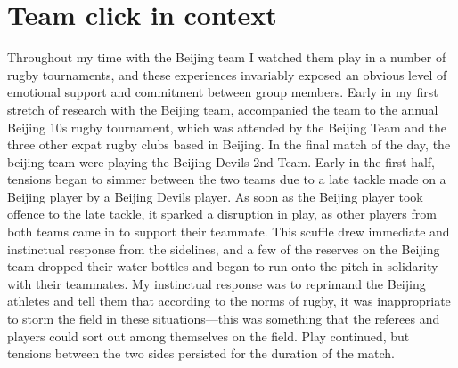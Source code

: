 
\begin{savequote}[8cm]

  \qauthor{}
\end{savequote}



\chapter{Team click in context \label{chap:ethnoResults}}

\minitoc






                                      \begin{CJK}{UTF8}{gbsn}



Throughout my time with the Beijing team I watched them play in a number of rugby tournaments, and these experiences invariably exposed an obvious level of emotional support and commitment between group members.  Early in my first stretch of research with the Beijing team, accompanied the team to the annual Beijing 10s rugby tournament, which was attended by the Beijing Team and the three other expat rugby clubs based in Beijing.  In the final match of the day, the beijing team were playing the Beijing Devils 2nd Team.  Early in the first half, tensions began to simmer between the two teams due to a late tackle made on a Beijing player by a Beijing Devils player.  As soon as the Beijing player took offence to the late tackle, it sparked a disruption in play, as other players from both teams came in to support their teammate.  This scuffle drew immediate and instinctual response from the sidelines, and a few of the reserves on the Beijing team dropped their water bottles and began to run onto the pitch in solidarity with their teammates.  My instinctual response was to reprimand the Beijing athletes and tell them that according to the norms of rugby, it was inappropriate to storm the field in these situations---this was something that the referees and players could sort out among themselves on the field.  Play continued, but tensions between the two sides persisted for the duration of the match.


\end{CJK}
